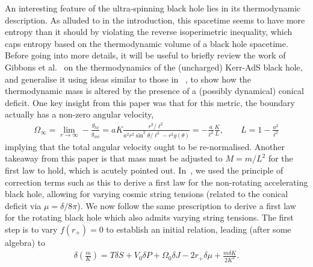 \documentclass[
twoside,openright,frontopenright]{dmathesis}
\begin{document}
An interesting feature of the ultra-spinning black hole lies in its
thermodynamic description. As alluded to in the introduction, this spacetime
seems to have more entropy than it should by violating the reverse isoperimetric
inequality, which caps entropy based on the thermodynamic volume of a black hole
spacetime. Before going into more details, it will be useful to briefly review
the work of Gibbons et al.~\cite{Gibbons:2004ai} on the thermodynamics of the
(uncharged) Kerr-AdS black hole, and generalise it using ideas similar to those
in ~\cite{Appels:2017xoe}, to show how the thermodynamic mass is altered by the
presence of a (possibly dynamical) conical deficit. One key insight from this
paper was that for this metric, the boundary actually has a non-zero angular
velocity,
\begin{align}
\Omega_\infty = \lim_{r\to\infty} -\frac{g_{t\phi}}{g_{\phi\phi}} = aK
  \frac{r^2/\ell^2}{a^2 r^2 \sin^2\theta/\ell^2- r^2 g(\theta)} = -
  \frac{a}{\ell^2} \frac{K}{L}, \qquad L = 1-\frac{a^2}{\ell^2}
\end{align}
implying that the total angular velocity ought to be re-normalised. Another
takeaway from this paper is that mass must be adjusted to $M=m/L^2$ for the
first law to hold, which is acutely pointed out. In~\cite{Appels:2017xoe}, we
used the principle of correction terms such as this to derive a first law for
the non-rotating accelerating black hole, allowing for varying cosmic string
tensions (related to the conical deficit via $\mu = \delta/8\pi$). We now follow
the same prescription to derive a first law for the rotating black hole which
also admits varying string tensions. The first step is to vary $f(r_+)=0$ to
establish an initial relation, leading (after some algebra) to
\begin{align}\label{eq:master-al}
\delta\left(\frac{m}{K}\right)=T\delta S +V_0\delta P + \Omega_0\delta J -
  2r_+\delta\mu + \frac{m\delta K}{2K^2}. 
\end{align}
\end{document}

